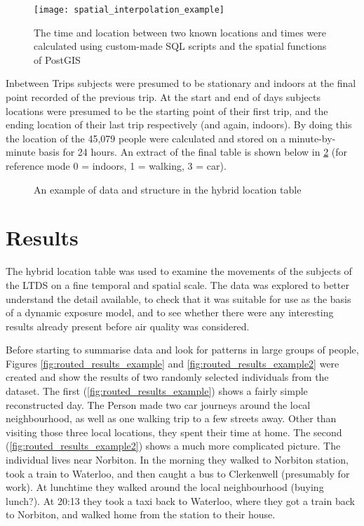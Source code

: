 \begin{figure}[H]
\centering
\texttt{[image: spatial\_interpolation\_example]}
\caption{The time and location between two known locations and times were calculated using custom-made SQL scripts and the spatial functions of PostGIS}
\label{fig:spatial_interpolation_example}
\end{figure}

Inbetween Trips subjects were presumed to be stationary and indoors at the final point recorded of the previous trip. At the start and end of days subjects locations were presumed to be the starting point of their first trip, and the ending location of their last trip respectively (and again, indoors). By doing this the location of the 45,079 people were calculated and stored on a minute-by-minute basis for 24 hours. An extract of the final table is shown below in \ref{fig:hybrid_location_table} (for reference mode 0 = indoors, 1 = walking, 3 = car).

\begin{figure}[H]
\centering
{}
\caption{An example of data and structure in the hybrid location table}
\label{fig:hybrid_location_table}
\end{figure}

\section{Results}
\label{sec:reconstruction_results}

The hybrid location table was used to examine the movements of the subjects of the LTDS on a fine temporal and spatial scale. The data was explored to better understand the detail available, to check that it was suitable for use as the basis of a dynamic exposure model, and to see whether there were any interesting results already present before air quality was considered.

Before starting to summarise data and look for patterns in large groups of people, Figures \ref{fig:routed_results_example} and \ref{fig:routed_results_example2} were created and show the results of two randomly selected individuals from the dataset. The first (\ref{fig:routed_results_example}) shows a fairly simple reconstructed day. The Person made two car journeys around the local neighbourhood, as well as one walking trip to a few streets away. Other than visiting those three local locations, they spent their time at home. The second (\ref{fig:routed_results_example2}) shows a much more complicated picture. The individual lives near Norbiton. In the morning they walked to Norbiton station, took a train to Waterloo, and then caught a bus to Clerkenwell (presumably for work). At lunchtime they walked around the local neighbourhood (buying lunch?). At 20:13 they took a taxi back to Waterloo, where they got a train back to Norbiton, and walked home from the station to their house.

